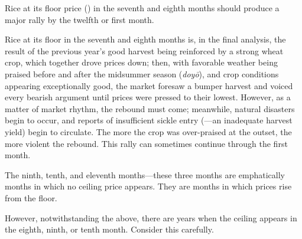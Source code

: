
\begin{sokyubox}
{\small\itshape\color{sokyubar} }

\medskip
Rice at its floor price () in the seventh and
eighth months should produce a major rally by the twelfth or first
month.
\end{sokyubox}

\commentary
Rice at its floor in the seventh and eighth months is, in the
final analysis, the result of the previous year's good harvest
being reinforced by a strong wheat crop, which together drove
prices down; then, with favorable weather being praised before and
after the midsummer season (\textit{doy\=o}), and crop conditions appearing
exceptionally good, the market foresaw a bumper harvest and voiced
every bearish argument until prices were pressed to their lowest.
However, as a matter of market rhythm, the rebound must come;
meanwhile, natural disasters begin to occur, and reports of
insufficient sickle entry (---an
inadequate harvest yield) begin to circulate. The more the crop
was over-praised at the outset, the more violent the rebound. This
rally can sometimes continue through the first month.


\begin{sokyubox}
{\small\itshape\color{sokyubar} }

\medskip
The ninth, tenth, and eleventh months---these three months
are emphatically months in which no ceiling price appears. They
are months in which prices rise from the floor.

However, notwithstanding the above, there are years when the
ceiling appears in the eighth, ninth, or tenth month. Consider
this carefully.
\end{sokyubox}

